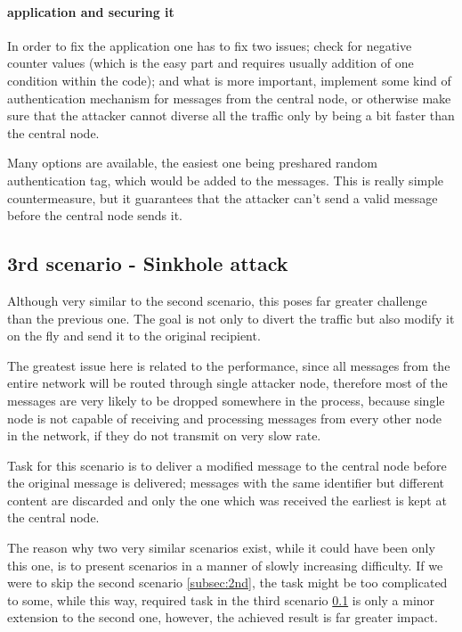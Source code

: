 \documentclass[
  digital, %
  table,   %
  nolof,     %
  nolot,     %
           oneside
]{fithesis3}
\begin{document}
    \paragraph{application and securing it}
    In order to fix the application one has to fix two issues; check for negative counter values (which is the easy part and requires usually addition of one condition within the code); and what is more important, implement some kind of authentication mechanism for messages from the central node, or otherwise make sure that the attacker cannot diverse all the traffic only by being a bit faster than the central node.

    Many options are available, the easiest one being preshared random authentication tag, which would be added to the messages. This is really simple countermeasure, but it guarantees that the attacker can't send a valid message before the central node sends it.

    \subsection{3rd scenario - Sinkhole attack}\label{subsec:3rd}
    Although very similar to the second scenario, this poses far greater   challenge than the previous one. The goal is not only to divert the traffic but also modify it on the fly and send it to the original recipient.

    The greatest issue here is related to the performance, since all messages from the entire network will be routed through single attacker node, therefore most of the messages are very likely to be dropped somewhere in the process, because single node is not capable of receiving and processing messages from every other node in the network, if they do not transmit on very slow rate.

    Task for this scenario is to deliver a modified message to the central node before the original message is delivered; messages with the same identifier but different content are discarded and only the one which was received the earliest is kept at the central node.

    The reason why two very similar scenarios exist, while it could have been only this one, is to present scenarios in a manner of slowly increasing difficulty. If we were to skip the second scenario \ref{subsec:2nd}, the task might be too complicated to some, while this way, required task in the third scenario \ref{subsec:3rd} is only a minor extension to the second one, however, the achieved result is far greater impact.
\end{document}
